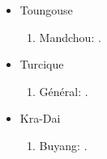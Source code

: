 \documentclass[oneside,a4paper,11pt]{article}
\newcommand{\zh}[1]{{\cn #1}}
\newcommand{\lingua}[3]{#2}%
\begin{document}
\begin{itemize}
\begin{enumerate}
\end{enumerate}
\item \lingua{Tungusic}{Toungouse}{通古斯语系}
\begin{enumerate}
\item \lingua{Manchu}{Mandchou}{满语}: \cite{fuente19am}.
\end{enumerate}
\item  \lingua{Turkic}{Turcique}{突厥语系}
\begin{enumerate}
\item \lingua{General}{Général}{总论}: \cite{antonov12kumush}.
\end{enumerate}
\item \lingua{Kra-Dai}{Kra-Dai}{侗台语系}
\begin{enumerate}
\item \lingua{Buyang}{Buyang}{布央语}: \cite{jacques17buyang}.
\end{enumerate}
\end{itemize}  
\end{document}
